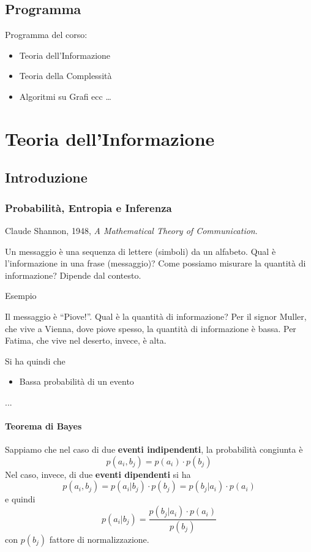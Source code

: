 \chapter*{Programma}

Programma del corso:
\begin{itemize}
    \item Teoria dell'Informazione
    \item Teoria della Complessità
    \item Algoritmi su Grafi ecc \dots
\end{itemize}





\part{Teoria dell'Informazione}

\chapter{Introduzione}

\section{Probabilità, Entropia e Inferenza}
Claude Shannon, 1948, \textit{A Mathematical Theory of Communication}.

Un messaggio è una sequenza di lettere (simboli) da un alfabeto. Qual è l'informazione in una frase (messaggio)? Come possiamo misurare la quantità di informazione? Dipende dal contesto.

\subparagraph{Esempio} Il messaggio è ``Piove!''. Qual è la quantità di informazione? Per il signor Muller, che vive a Vienna, dove piove spesso, la quantità di informazione è bassa. Per Fatima, che vive nel deserto, invece, è alta.\bigskip

Si ha quindi che
\begin{itemize}
    \item Bassa probabilità di un evento 
\end{itemize}

...

\subsection{Teorema di Bayes}
Sappiamo che nel caso di due \textbf{eventi indipendenti}, la probabilità congiunta è
$$
    p(a_i,b_j) = p(a_i)\cdot p(b_j)
$$
Nel caso, invece, di due \textbf{eventi dipendenti} si ha
$$
    p(a_i,b_j) = p(a_i|b_j)\cdot p(b_j) = p(b_j|a_i)\cdot p(a_i)
$$
e quindi
$$
p(a_i|b_j) = \dfrac{p(b_j|a_i)\cdot p(a_i)}{p(b_j)}
$$
con $p(b_j)$ fattore di normalizzazione.

